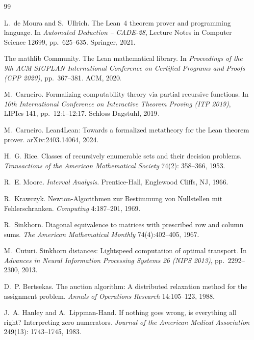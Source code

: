 \documentclass[11pt]{article}
\theoremstyle{definition}
\theoremstyle{remark}
\begin{document}
\begin{thebibliography}{99}

L.~de Moura and S.~Ullrich.
\newblock The Lean~4 theorem prover and programming language.
\newblock In \emph{Automated Deduction -- CADE-28}, Lecture Notes in Computer
Science 12699, pp.~625--635. Springer, 2021.

The mathlib Community.
\newblock The Lean mathematical library.
\newblock In \emph{Proceedings of the 9th ACM SIGPLAN International Conference
on Certified Programs and Proofs (CPP 2020)}, pp.~367--381. ACM, 2020.

M.~Carneiro.
\newblock Formalizing computability theory via partial recursive functions.
\newblock In \emph{10th International Conference on Interactive Theorem
Proving (ITP 2019)}, LIPIcs 141, pp.~12:1--12:17. Schloss
Dagstuhl, 2019.

M.~Carneiro.
\newblock Lean4Lean: Towards a formalized metatheory for the Lean theorem
prover.
\newblock arXiv:2403.14064, 2024.

H.~G. Rice.
\newblock Classes of recursively enumerable sets and their decision problems.
\newblock \emph{Transactions of the American Mathematical Society} 74(2):
358--366, 1953.

R.~E. Moore.
\newblock \emph{Interval Analysis}.
\newblock Prentice-Hall, Englewood Cliffs, NJ, 1966.

R.~Krawczyk.
\newblock Newton-Algorithmen zur Bestimmung von Nullstellen mit
Fehlerschranken.
\newblock \emph{Computing} 4:187--201, 1969.

R.~Sinkhorn.
\newblock Diagonal equivalence to matrices with prescribed row and column
sums.
\newblock \emph{The American Mathematical Monthly} 74(4):402--405, 1967.

M.~Cuturi.
\newblock Sinkhorn distances: Lightspeed computation of optimal transport.
\newblock In \emph{Advances in Neural Information Processing Systems 26
(NIPS 2013)}, pp.~2292--2300, 2013.

D.~P. Bertsekas.
\newblock The auction algorithm: A distributed relaxation method for the
assignment problem.
\newblock \emph{Annals of Operations Research} 14:105--123, 1988.

J.~A. Hanley and A.~Lippman-Hand.
\newblock If nothing goes wrong, is everything all right? Interpreting zero
numerators.
\newblock \emph{Journal of the American Medical Association} 249(13):
1743--1745, 1983.

\end{thebibliography}
\end{document}
